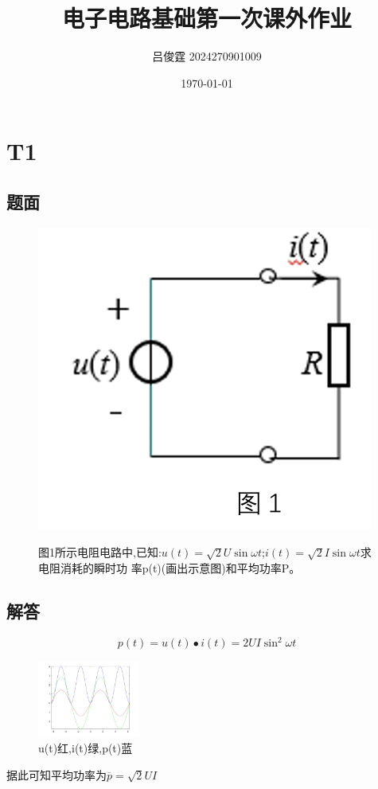 \documentclass[10pt, a4paper]{article} %
\title{电子电路基础第一次课外作业}
\author{吕俊霆 2024270901009}
\date{\today}
\begin{document}
\maketitle

\section{T1}
\subsection{题面}

\begin{figure}[htbp] %
    \centering
    \begin{minipage}[t]{0.48\textwidth} %
        \centering
        \includegraphics[width=\linewidth]{image/T1.png} %
        \label{fig:side:a}
    \end{minipage}
    \hfill %
    \begin{minipage}[t]{0.48\textwidth} %
        图1所示电阻电路中,已知:$u\left(t\right) =  \sqrt{2}U\sin\omega t  $;$i\left(t\right)=\sqrt{2}I\sin\omega t$求电阻消耗的瞬时功
率p(t)(画出示意图)和平均功率P。
    \end{minipage}
\end{figure}
\subsection{解答}
$$
p(t) = u(t)\bullet i(t) = 2UI\sin^{2}\omega t
$$
\begin{figure}
    \centering
    \includegraphics[width=0.3\textwidth]{image/T1.jpg}
    \caption{u(t)红,i(t)绿,p(t)蓝}
\end{figure}
据此可知平均功率为$\overline{p} = \sqrt{2}UI $
\end{document}
